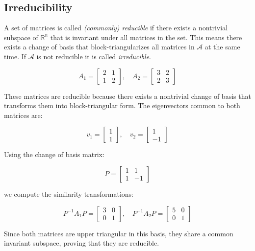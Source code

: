 \subsection*{Irreducibility}
\begin{definition}
    A set of matrices is called \emph{(commonly) reducible} if there exists a nontrivial subspace of $\mathbb{R}^n$ that is invariant under all matrices in the set. This means there exists a change of basis that block-triangularizes all matrices in $\mathcal{A}$ at the same time. If $\mathcal{A}$ is not reducible it is called \emph{irreducible}. 
\end{definition}
\begin{example}
    \[
    A_1 = \begin{bmatrix} 2 & 1 \\ 1 & 2 \end{bmatrix}, \quad
    A_2 = \begin{bmatrix} 3 & 2 \\ 2 & 3 \end{bmatrix}
    \]

    These matrices are reducible because there exists a nontrivial change of basis that transforms them into block-triangular form. The eigenvectors common to both matrices are:

    \[
    v_1 = \begin{bmatrix} 1 \\ 1 \end{bmatrix}, \quad
    v_2 = \begin{bmatrix} 1 \\ -1 \end{bmatrix}
    \]

    Using the change of basis matrix:

    \[
    P = \begin{bmatrix} 1 & 1 \\ 1 & -1 \end{bmatrix}
    \]

    we compute the similarity transformations:

    \[
    P^{-1} A_1 P = \begin{bmatrix} 3 & 0 \\ 0 & 1 \end{bmatrix}, \quad
    P^{-1} A_2 P = \begin{bmatrix} 5 & 0 \\ 0 & 1 \end{bmatrix}
    \]

    Since both matrices are upper triangular in this basis, they share a common invariant subspace, proving that they are reducible.
\end{example}

